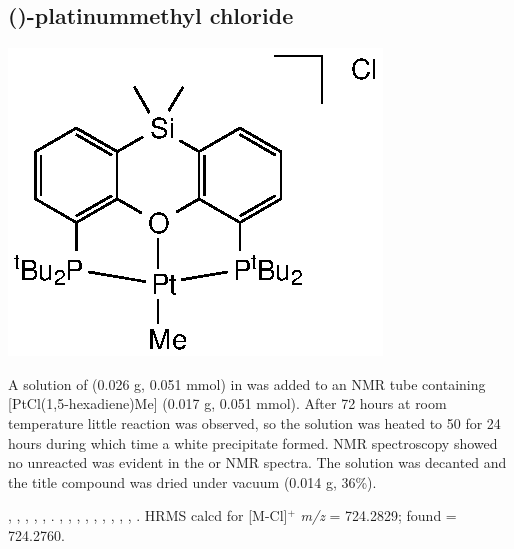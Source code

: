 
\subsection*{(\tBuSixantphosk)-platinummethyl chloride}
\begin{structure}[h]
\begin{center}
\includegraphics{../Structures/SitBuPtMe.eps}
\end{center}
\end{structure}

A solution of \tBusixantphos{} (0.026 g, 0.051 mmol) in  was added to an NMR tube containing [PtCl(1,5-hexadiene)Me] (0.017 g, 0.051 mmol).  After 72 hours at room temperature little reaction was observed, so the solution was heated to 50\degC{} for 24 hours during which time a white precipitate formed.  NMR spectroscopy showed no unreacted \tBusixantphos{} was evident in the \proton{} or \phosphorus{} NMR spectra.  The solution was decanted and the title compound was dried under vacuum (0.014 g, 36\%).  

,
,
,
,
,
.
,
,
,
,
,
,
,
,
,
.
HRMS calcd for  [M-Cl]$^+$ \emph{m/z} = 724.2829; found = 724.2760.


